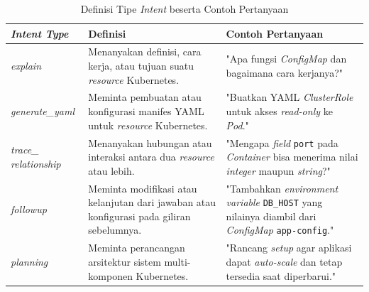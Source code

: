 \renewcommand{\arraystretch}{1.3}
\captionsetup[table]{justification=raggedright,singlelinecheck=false}
\begin{table}[H]
\caption{Definisi Tipe \textit{Intent} beserta Contoh Pertanyaan}
\label{tbl:intent_definisi}
\centering
\begin{tabular}{|p{}|p{}|p{}|}
\hline
\textbf{\textit{Intent Type}} & \textbf{Definisi} & \textbf{Contoh Pertanyaan} \\
\hline
\textit{explain} & Menanyakan definisi, cara kerja, atau tujuan suatu \textit{resource} Kubernetes. & "Apa fungsi \textit{ConfigMap} dan bagaimana cara kerjanya?" \\
\hline
\textit{generate\_yaml} & Meminta pembuatan atau konfigurasi manifes YAML untuk \textit{resource} Kubernetes. & "Buatkan YAML \textit{ClusterRole} untuk akses \textit{read-only} ke \textit{Pod}." \\
\hline
\textit{trace\_ relationship} & Menanyakan hubungan atau interaksi antara dua \textit{resource} atau lebih. & "Mengapa \textit{field} \texttt{port} pada \textit{Container} bisa menerima nilai \textit{integer} maupun \textit{string}?" \\
\hline
\textit{followup} & Meminta modifikasi atau kelanjutan dari jawaban atau konfigurasi pada giliran sebelumnya. & "Tambahkan \textit{environment variable} \texttt{DB\_HOST} yang nilainya diambil dari \textit{ConfigMap} \texttt{app-config}." \\
\hline
\textit{planning} & Meminta perancangan arsitektur sistem multi-komponen Kubernetes. & "Rancang \textit{setup} agar aplikasi dapat \textit{auto-scale} dan tetap tersedia saat diperbarui." \\
\hline
\end{tabular}
\end{table}

